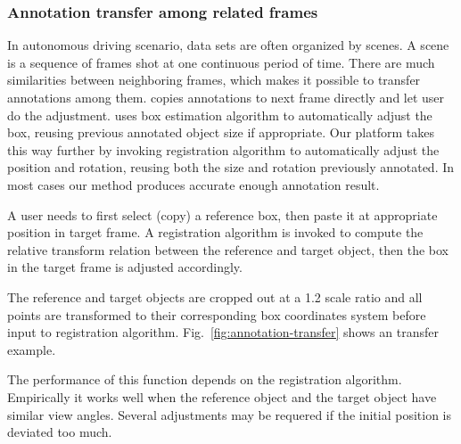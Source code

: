 \documentclass[letterpaper, 10 pt, conference]{ieeeconf}  %
\begin{document}
\subsubsection{Annotation transfer among related frames}
\label{semi-auto-anno}
In autonomous driving scenario, data sets are often organized by scenes\cite{Caesar2019nuScenesAM,Patil2019TheHD,lyft2019}. A scene is a sequence of frames shot at one continuous period of time. There are much similarities between neighboring frames, which makes it possible to transfer annotations among them. \cite{Zimmer20193DBA} copies annotations to next frame directly and let user do the adjustment.\cite{Wang2019LATTEAL} uses box estimation algorithm to automatically adjust the box, reusing previous annotated object size if appropriate. Our platform takes this way further by invoking registration algorithm \cite{Yang2016GoICPAG} to automatically adjust the position and rotation, reusing both the size and rotation previously annotated. In most cases our method produces  accurate enough annotation result.

A user needs to first select (copy) a reference box, then paste it at appropriate position in target frame. A registration algorithm is invoked to compute the relative transform relation between the reference and target object, then the box in the target frame is adjusted accordingly.

The reference and target objects are cropped out at a 1.2 scale ratio and all points are transformed to their corresponding box coordinates system before input to registration algorithm. Fig.~\ref{fig:annotation-transfer} shows an transfer example.

The performance of this function depends on the registration algorithm.  Empirically it works well when the reference object and the target object have similar view angles. Several adjustments may be requered if the initial position is deviated too much.
\end{document}
